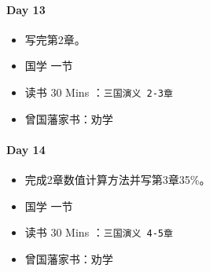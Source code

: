 \documentclass[UTF8,a4paper,8pt]{ctexart}
\begin{document}
 	 \paragraph{Day 13      \quad     }
	 	 \begin{itemize}[itemindent = 1em]
	 	 	\renewcommand\labelitemi{\makebox[0pt][l]{$\square$}\raisebox{.15ex}{\hspace{0.1em}$\checkmark$}}		
	 	 	
	 	 	\item    写完第2章。
	 	 	
	 	 	
	 	 	\renewcommand\labelitemi{\makebox[0pt][l]{$\square$}\hspace{1em}}
	 	 	\item   国学  一节
	 	 	\item   读书  30 Mins	：\verb|三国演义 2-3章|
	 	 	\item   曾国藩家书：劝学
	 	 \end{itemize}
	 	 
	 	 
 	 \paragraph{Day 14      \quad     }
	 	 \begin{itemize}[itemindent = 1em]
	 	 	\renewcommand\labelitemi{\makebox[0pt][l]{$\square$}\raisebox{.15ex}{\hspace{0.1em}$\checkmark$}}		
	 	 	
	 	 	\item    完成2章数值计算方法并写第3章35\%。
	 	 	
	 	 	
	 	 	\renewcommand\labelitemi{\makebox[0pt][l]{$\square$}\hspace{1em}}
	 	 	\item   国学  一节
	 	 	\item   读书  30 Mins	：\verb|三国演义 4-5章|
	 	 	\item   曾国藩家书：劝学
	 	 \end{itemize}
\end{document}
